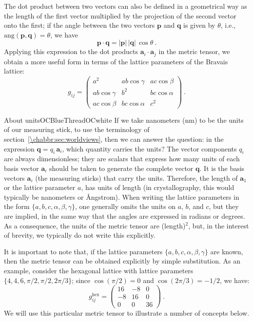 The dot product between two vectors can also be defined in a geometrical way as the length of the first vector multiplied by the projection of the second vector onto the first; if the angle between the two vectors $\mathbf{p}$ and $\mathbf{q}$ is given by $\theta$, i.e., $\text{ang}(\mathbf{p},\mathbf{q})=\theta$, we have
\begin{equation}
	\mathbf{p}\cdot\mathbf{q} =\vert \mathbf{p}\vert\,\vert\mathbf{q}\vert\,\cos\theta\ .\label{\chabbr:eq:dpgeom}
\end{equation}
Applying this expression to the dot products $\mathbf{a}_i\cdot\mathbf{a}_j$ in the metric tensor, we obtain a more useful form in terms of the lattice parameters of the Bravais lattice:
\begin{equation}
	g_{ij} = \begin{pmatrix}a^2 & a b \cos\gamma & a c \cos\beta\\
	 a b \cos\gamma & b^2 & b c \cos\alpha\\
	 a c \cos\beta & b c \cos\alpha & c^2\end{pmatrix}\ . \label{\chabbr:eq:gabc}
\end{equation}

\begin{messagebox}{About units}{OCBlueThread}{\icinfo}{OCwhite}
If we take nanometers (nm) to be the units of our measuring stick, to use the terminology of section~\ref{\chabbr:sec:worldviews}, then we can answer the question: in the expression $\mathbf{q}=q_i\,\mathbf{a}_i$, which quantity carries the units?  The vector components $q_i$ are always dimensionless; they are scalars that express how many units of each basis vector $\mathbf{a}_i$ should be taken to generate the complete vector $\mathbf{q}$. It is the basis vectors $\mathbf{a}_i$ (the measuring sticks) that carry the units.  Therefore, the length of $\mathbf{a}_1$ or the lattice parameter $a$, has units of length (in crystallography, this would typically be nanometers or \AA ngstrom).  When writing the lattice parameters in the form $\{a,b,c,\alpha,\beta,\gamma\}$, one generally omits the units on $a$, $b$, and $c$, but they are implied, in the same way that the angles are expressed in radians or degrees.  As a consequence, the units of the metric tensor are (length)$^2$, but, in the interest of brevity, we typically do not write this explicitly.
\end{messagebox}

It is important to note that, if the lattice parameters $\{a,b,c,\alpha,\beta,\gamma\}$ are known, then the metric tensor can be obtained explicitly by simple substitution. As an example, consider the hexagonal lattice with lattice parameters $\{4,4,6,\pi/2,\pi/2,2\pi/3\}$; since $\cos(\pi/2)=0$ and $\cos(2\pi/3)=-1/2$, we have:
\[
	g_{ij}^{\text{hex}} = \begin{pmatrix}16 & -8& 0 \\ -8 & 16 & 0\\  0 & 0 & 36\end{pmatrix}\ .
\]
We will use this particular metric tensor to illustrate a number of concepts below.

